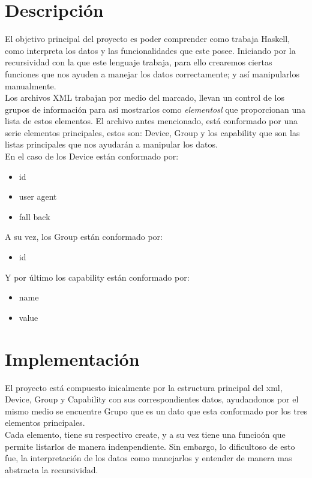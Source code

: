 \documentclass[12pt]{book} %
\begin{document}
\chapter{Descripci\'on}
El objetivo principal del proyecto es poder comprender como trabaja Haskell, como interpreta los datos y las funcionalidades que este posee. Iniciando por la recursividad con la que este lenguaje trabaja, para ello crearemos ciertas funciones que nos ayuden a manejar los datos correctamente; y as\'i manipularlos manualmente.~\\[0.5cm]

Los archivos XML trabajan por medio del marcado, llevan un control de los grupos de informaci\'on para asi mostrarlos como \textit{elementosl} que proporcionan una lista de estos elementos. El archivo antes mencionado, est\'a conformado por una serie elementos principales, estos son: Device, Group y los capability que son las listas principales que nos ayudar\'an a manipular los datos.~\\[0.5cm]

En el caso de los Device est\'an conformado por: 
\begin{itemize}
  \item id
  \item user agent
  \item fall back
\end{itemize}

A su vez, los Group est\'an conformado por: 
\begin{itemize}
  \item id
\end{itemize}

Y por \'ultimo los capability est\'an conformado por: 
\begin{itemize}
  \item name
  \item value
\end{itemize}


\chapter{Implementaci\'on}
El proyecto est\'a compuesto inicalmente por la estructura principal del xml, Device, Group y Capability con sus correspondientes datos, ayudandonos por el mismo medio se encuentre Grupo que es un dato que esta conformado por los tres elementos principales.~\\[0.5cm]
 Cada elemento, tiene su respectivo create, y a su vez tiene una funcio\'on que permite listarlos de manera indenpendiente. Sin embargo, lo dificultoso de esto fue, la interpretaci\'on de los datos como manejarlos y entender de manera mas abstracta la recursividad.~\\[0.5cm]
\end{document}
